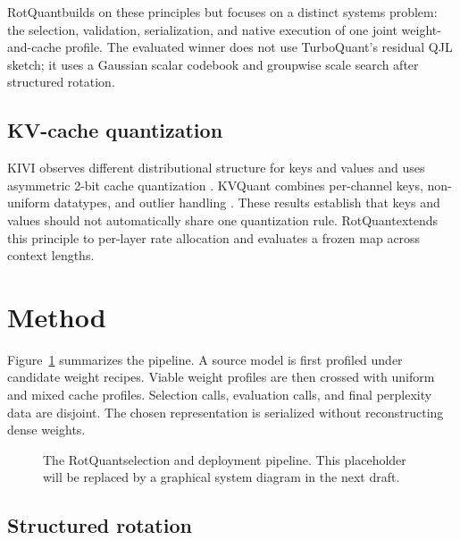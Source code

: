 \documentclass[10pt,twocolumn]{article}
\newcommand{\method}{RotQuant}
\begin{document}
\method builds on these principles but focuses on a distinct systems problem:
the selection, validation, serialization, and native execution of one joint
weight-and-cache profile. The evaluated winner does not use TurboQuant's
residual QJL sketch; it uses a Gaussian scalar codebook and groupwise scale
search after structured rotation.

\subsection{KV-cache quantization}

KIVI observes different distributional structure for keys and values and uses
asymmetric 2-bit cache quantization \cite{liu2024kivi}. KVQuant combines
per-channel keys, non-uniform datatypes, and outlier handling
\cite{hooper2024kvquant}. These results establish that keys and values should
not automatically share one quantization rule. \method extends this principle
to per-layer rate allocation and evaluates a frozen map across context lengths.

\section{Method}

Figure~\ref{fig:overview} summarizes the pipeline. A source model is first
profiled under candidate weight recipes. Viable weight profiles are then
crossed with uniform and mixed cache profiles. Selection calls, evaluation
calls, and final perplexity data are disjoint. The chosen representation is
serialized without reconstructing dense weights.

\begin{figure}[t]
\centering
{}
\caption{The \method selection and deployment pipeline. This placeholder will
be replaced by a graphical system diagram in the next draft.}
\label{fig:overview}
\end{figure}

\subsection{Structured rotation}
\end{document}
